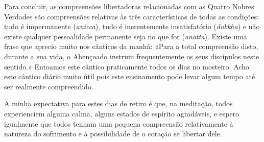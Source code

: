 Para concluir, as compreensões libertadoras relacionadas com as Quatro
Nobres Verdades são compreensões relativas às três características de
todas as condições: tudo é impermanente (\emph{anicca}), tudo é
inerentemente insatisfatório (\emph{dukkha}) e não existe qualquer
pessoalidade permanente seja no que for (\emph{anatta}). Existe uma
frase que aprecio muito nos cânticos da manhã: «Para a total compreensão
disto, durante a sua vida, o Abençoado instruiu frequentemente os seus
discípulos neste sentido.» Entoamos este cântico praticamente todos os
dias no mosteiro. Acho este cântico diário muito útil pois este
ensinamento pode levar algum tempo até ser realmente compreendido.

A minha expectativa para estes dias de retiro é que, na meditação, todos
experienciem alguma calma, alguns estados de espírito agradáveis, e
espero igualmente que todos tenham uma pequena compreensão relativamente
à natureza do sofrimento e à possibilidade de o coração se libertar
dele.

